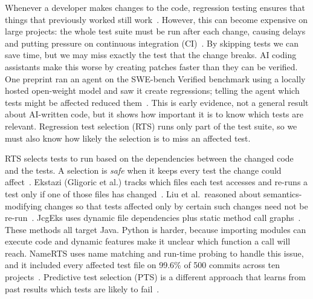 \documentclass[conference]{IEEEtran}
\begin{document}
Whenever a developer makes changes to the code, regression testing ensures that things that previously worked still work~\cite{yoo2012survey}. However, this can become expensive on large projects: the whole test suite must be run after each change, causing delays and putting pressure on continuous integration (CI)~\cite{elbaum2014ci,memon2017taming}. By skipping tests we can save time, but we may miss exactly the test that the change breaks. AI coding assistants make this worse by creating patches faster than they can be verified. One preprint ran an agent on the SWE-bench Verified benchmark using a locally hosted open-weight model and saw it create regressions; telling the agent which tests might be affected reduced them~\cite{alonso2026tdad}. This is early evidence, not a general result about AI-written code, but it shows how important it is to know which tests are relevant. Regression test selection (RTS) runs only part of the test suite, so we must also know how likely the selection is to miss an affected test.

RTS selects tests to run based on the dependencies between the changed code and the tests. A selection is \emph{safe} when it keeps every test the change could affect~\cite{legunsen2016static}. Ekstazi (Gligoric et al.) tracks which files each test accesses and re-runs a test only if one of those files has changed~\cite{gligoric2015ekstazi}. Liu et al.\ reasoned about semantics-modifying changes so that tests affected only by certain such changes need not be re-run~\cite{liu2023finerts}. JcgEks uses dynamic file dependencies plus static method call graphs~\cite{zhang2024jcgeks}. These methods all target Java. Python is harder, because importing modules can execute code and dynamic features make it unclear which function a call will reach. NameRTS uses name matching and run-time probing to handle this issue, and it included every affected test file on 99.6\% of 500 commits across ten projects~\cite{wang2026namerts}. Predictive test selection (PTS) is a different approach that learns from past results which tests are likely to fail~\cite{machalica2019pts}.
\end{document}
